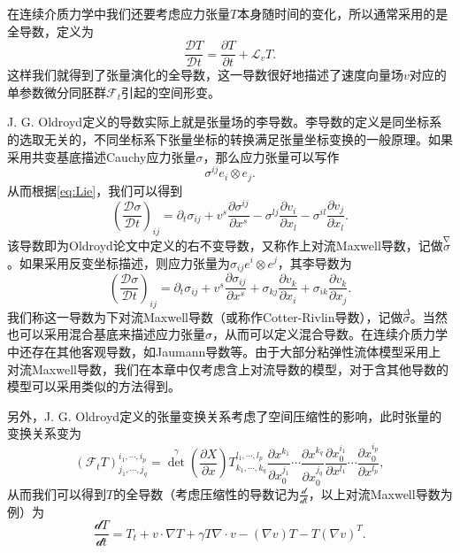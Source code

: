 在连续介质力学中我们还要考虑应力张量$T$本身随时间的变化，所以通常采用的是全导数，定义为
\begin{equation*}
	\frac{\mathcal{D} T}{\mathcal{D}t} = \frac{\partial T}{\partial t} + \mathcal{L}_v T. 
\end{equation*}
这样我们就得到了张量演化的全导数，这一导数很好地描述了速度向量场$v$对应的单参数微分同胚群$\mathcal{F}_t$引起的空间形变\cite{dubrovinmodern}。

J. G. Oldroyd定义的导数实际上就是张量场的李导数。李导数的定义是同坐标系的选取无关的，不同坐标系下张量坐标的转换满足张量坐标变换的一般原理。如果采用共变基底描述Cauchy应力张量$\sigma$，那么应力张量可以写作
\begin{equation*}{}
	\sigma^{ij} e_i \otimes e_j.
\end{equation*}
从而根据\eqref{eq:Lie}，我们可以得到
\begin{equation}
	\left( \frac{\mathcal{D} \sigma}{\mathcal{D}t}  \right)_{ij} = \partial_t \sigma_{ij} + v^s \frac{\partial \sigma^{ij}}{\partial x^s} - \sigma^{lj} \frac{\partial v_i}{\partial x_l} -  \sigma^{il} \frac{\partial v_j}{\partial x_l}. 
\end{equation}
该导数即为Oldroyd论文中定义的右不变导数，又称作上对流Maxwell导数，记做$\stackrel{\nabla} \sigma$。如果采用反变坐标描述，则应力张量为$\sigma_{ij} e^i \otimes e^j$，其李导数为
\begin{equation}
	\left( \frac{\mathcal{D} \sigma}{\mathcal{D}t} \right)_{ij} = \partial_t \sigma_{ij} + v^s \frac{\partial \sigma_{ij}}{\partial x^s} + \sigma_{kj} \frac{\partial v_k}{\partial x_i} +  \sigma_{ik} \frac{\partial v_k}{\partial x_j}. 
\end{equation}
我们称这一导数为下对流Maxwell导数（或称作Cotter-Rivlin导数），记做$\stackrel{\Delta} \sigma$\cite{oldroyd1950formulation,dimitrienko2010nonlinear}。当然也可以采用混合基底来描述应力张量$\sigma$，从而可以定义混合导数。在连续介质力学中还存在其他客观导数，如Jaumann导数等。由于大部分粘弹性流体模型采用上对流Maxwell导数，我们在本章中仅考虑含上对流导数的模型，对于含其他导数的模型可以采用类似的方法得到。

另外，J. G. Oldroyd定义的张量变换关系考虑了空间压缩性的影响，此时张量的变换关系变为
\begin{equation*}
	(\mathcal{F}_t T)^{i_1,\cdots,i_p}_{j_1, \cdots,j_q} = {\det}^\gamma({\frac{\partial X}{\partial x}}) T^{l_1,\cdots,l_p}_{k_1, \cdots,k_q} \frac{\partial x^{k_1}}{\partial x_0^{j_1}} \cdots \frac{\partial x^{k_q}}{\partial x_0^{j_q}} \frac{\partial x_0^{i_1}}{\partial x^{l_1}} \cdots \frac{\partial x_0^{i_p}}{\partial x^{l_p}},  
\end{equation*}
从而我们可以得到$T$的全导数（考虑压缩性的导数记为$\frac{\mathcal{d}}{\mathcal{d} t}$，以上对流Maxwell导数为例）为
\begin{equation*}
	\frac{\mathcal{d} T}{\mathcal{d} t} =  T_t +v \cdot \nabla T + \gamma T \nabla \cdot v - (\nabla v) T - T(\nabla v)^T.   
\end{equation*}

